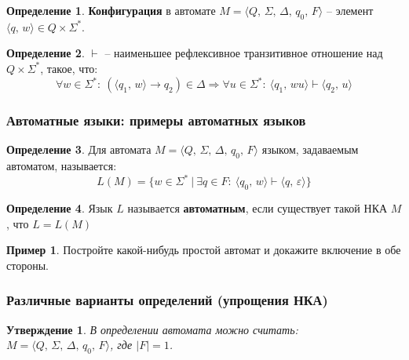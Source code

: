 \documentclass[a4paper,12pt]{article}
\theoremstyle{plain}
\newtheorem{proposition}{Утверждение}[subsection]
\theoremstyle{definition}
\newtheorem{definition}{Определение}[subsection]
\newtheorem*{example}{Пример}
\theoremstyle{remark}
\begin{document}
\begin{definition}
	\textbf{Конфигурация} в автомате $M = \langle Q,\,\Sigma,\, \Delta,\, q_0,\, F \rangle$ -- элемент $\langle q,\, w\rangle \in Q \times \Sigma^*$.
\end{definition}

\begin{definition}
	$\vdash$ -- наименьшее рефлексивное транзитивное отношение над $Q \times \Sigma^*$, такое, что:
	\[
		\forall w \in \Sigma^*:\: (\langle q_1,\,w\rangle \to q_2) \in \Delta \Rightarrow \forall u \in \Sigma^*:\: \langle q_1,\,wu\rangle \vdash \langle q_2,\,u\rangle
	\]
\end{definition}

\subsubsection*{Автоматные языки: примеры автоматных языков}
\begin{definition}
	Для автомата $M = \langle Q,\,\Sigma,\, \Delta,\, q_0,\, F \rangle$ языком, задаваемым автоматом, называется:
	\[
		L(M) = \{w \in \Sigma^* \:|\: \exists q \in F :\: \langle q_0,\, w\rangle \vdash \langle q,\, \varepsilon\rangle\}
	\]
\end{definition}

\begin{definition}
	Язык $L$ называется \textbf{автоматным}, если существует такой НКА $M$, что $L = L(M)$
\end{definition}

\begin{example}
	Постройте какой-нибудь простой автомат и докажите включение в обе стороны.
\end{example}

\subsubsection*{Различные варианты определений (упрощения НКА)}
\begin{proposition}
	В определении автомата можно считать: $M = \langle Q,\,\Sigma,\, \Delta,\, q_0,\, F \rangle$, где $|F| = 1$.
\end{proposition}
\end{document}
